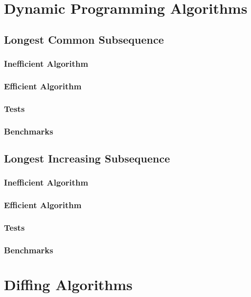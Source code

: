 \section{Dynamic Programming Algorithms}

\subsection{Longest Common Subsequence}

\subsubsection{Inefficient Algorithm}

\subsubsection{Efficient Algorithm}

\subsubsection{Tests}

\subsubsection{Benchmarks}

\subsection{Longest Increasing Subsequence}

\subsubsection{Inefficient Algorithm}

\subsubsection{Efficient Algorithm}

\subsubsection{Tests}

\subsubsection{Benchmarks}

\section{Diffing Algorithms}

